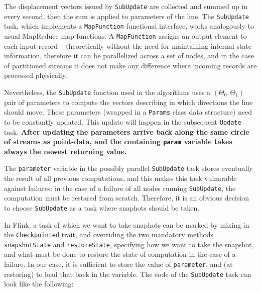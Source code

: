 The displacement vectors issued by \verb:SubUpdate: are collected and summed up in every second, then the sum is applied to parameters of the line. 
The \verb:SubUpdate: task, which implements a \verb|MapFunction| functional interface, works analogously to usual MapReduce map functions. A \verb|MapFunction| assigns an output element to each input record -- theoretically without the need for maintaining internal state information, therefore it can be parallelized across a set of nodes, and in the case of partitioned streams it does not make any difference where incoming records are processed physically.

Nevertheless, the \verb:SubUpdate: function used in the algorithms uses a $(\Theta_0,\Theta_1)$ pair of parameters to compute the vectors describing in which directions the line should move. These parameters (wrapped in a \verb|Params| class data structure) need to be constantly updated. This update will happen in the subsequent \verb|Update| task. {\bf  After updating the parameters arrive back along the same circle of streams as point-data, and the containing \verb|param| variable takes always the newest returning value.}

The \verb|parameter| variable in the possibly parallel \verb:SubUpdate: task stores eventually the result of all previous computations, and this makes this task vulnarable against failures: in the case of a failure of all nodes running \verb:SubUpdate:, the computation must be restared from scratch. Therefore, it is an obvious decision to choose \verb:SubUpdate: as a task where snaphots should be taken.  

In Flink, a task of which we want to take snaphots can be marked by mixing in the \verb|Checkpointed| trait, and overriding the two mandatory methods \verb|snapshotState| and \verb|restoreState|, specifying how we want to take the snapshot, and what must be done to restore the state of computation in the case of a failure. In our case, it is sufficient to store the value of \verb|parameter|, and (at restoring) to load that back in the variable. The code of the \verb:SubUpdate: task can look like the following:

